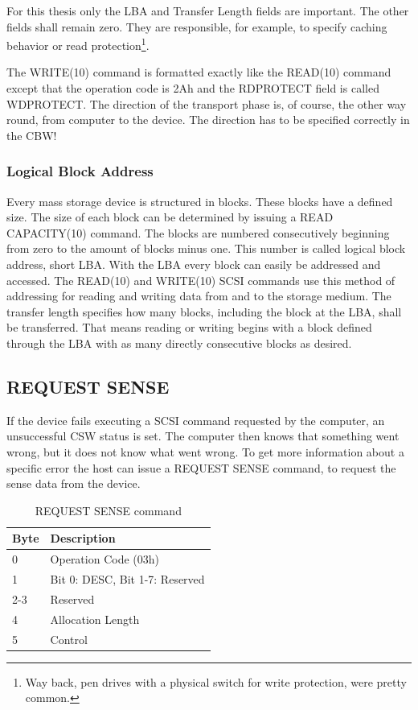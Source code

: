 For this thesis only the LBA and Transfer Length fields are important. The other fields shall remain zero. They are responsible, for example, to specify caching behavior or read protection\footnote{Way back, pen drives with a physical switch for write protection, were pretty common.}.

The WRITE(10) command is formatted exactly like the READ(10) command except that the operation code is 2Ah and the RDPROTECT field is called WDPROTECT. The direction of the transport phase is, of course, the other way round, from computer to the device. The direction has to be specified correctly in the CBW!

\subsubsection{Logical Block Address}

Every mass storage device is structured in blocks. These blocks have a defined size. The size of each block can be determined by issuing a READ CAPACITY(10) command. The blocks are numbered consecutively beginning from zero to the amount of blocks minus one. This number is called logical block address, short LBA. With the LBA every block can easily be addressed and accessed. The READ(10) and WRITE(10) SCSI commands use this method of addressing for reading and writing data from and to the storage medium. The transfer length specifies how many blocks, including the block at the LBA, shall be transferred. That means reading or writing begins with a block defined through the LBA with as many directly consecutive blocks as desired.

\subsection{REQUEST SENSE}

If the device fails executing a SCSI command requested by the computer, an unsuccessful CSW status is set. The computer then knows that something went wrong, but it does not know what went wrong. To get more information about a specific error the host can issue a REQUEST SENSE command, to request the sense data from the device.

\begin{table}[ht]
\caption{REQUEST SENSE command \cite{scsi_seagate}}
\centering
\begin{tabular}{|l|l|}
\hline\hline
\textbf{Byte} & \textbf{Description}\\ \hline
0 & Operation Code (03h)\\ \hline
1 & Bit 0: DESC, Bit 1-7: Reserved \\ \hline
2-3 & Reserved \\ \hline
4 & Allocation Length \\ \hline
5 & Control \\ \hline
\end{tabular}
\label{table:request_sense}
\end{table}


